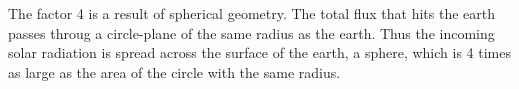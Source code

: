 
The factor 4 is a result of spherical geometry. The total flux that hits the earth passes throug a circle-plane of the same radius as the earth. Thus the incoming solar radiation is spread across the surface of the earth, a sphere, which is 4 times as large as the area of the circle with the same radius.
